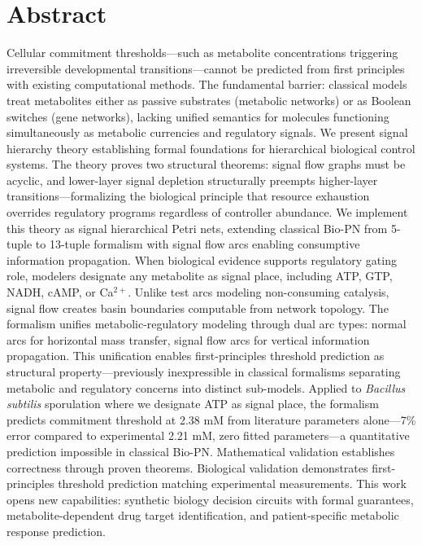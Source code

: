 \documentclass[10pt,letterpaper]{article}
\begin{document}
\section*{Abstract}
Cellular commitment thresholds---such as metabolite concentrations triggering irreversible developmental transitions---cannot be predicted from first principles with existing computational methods. The fundamental barrier: classical models treat metabolites either as passive substrates (metabolic networks) or as Boolean switches (gene networks), lacking unified semantics for molecules functioning simultaneously as metabolic currencies and regulatory signals. We present signal hierarchy theory establishing formal foundations for hierarchical biological control systems. The theory proves two structural theorems: signal flow graphs must be acyclic, and lower-layer signal depletion structurally preempts higher-layer transitions---formalizing the biological principle that resource exhaustion overrides regulatory programs regardless of controller abundance. We implement this theory as signal hierarchical Petri nets, extending classical Bio-PN from 5-tuple to 13-tuple formalism with signal flow arcs enabling consumptive information propagation. When biological evidence supports regulatory gating role, modelers designate any metabolite as signal place, including ATP, GTP, NADH, cAMP, or Ca$^{2+}$. Unlike test arcs modeling non-consuming catalysis, signal flow creates basin boundaries computable from network topology. The formalism unifies metabolic-regulatory modeling through dual arc types: normal arcs for horizontal mass transfer, signal flow arcs for vertical information propagation. This unification enables first-principles threshold prediction as structural property---previously inexpressible in classical formalisms separating metabolic and regulatory concerns into distinct sub-models. Applied to \textit{Bacillus subtilis} sporulation where we designate ATP as signal place, the formalism predicts commitment threshold at 2.38 mM from literature parameters alone---7\% error compared to experimental 2.21 mM, zero fitted parameters---a quantitative prediction impossible in classical Bio-PN. Mathematical validation establishes correctness through proven theorems. Biological validation demonstrates first-principles threshold prediction matching experimental measurements. This work opens new capabilities: synthetic biology decision circuits with formal guarantees, metabolite-dependent drug target identification, and patient-specific metabolic response prediction.
\end{document}
